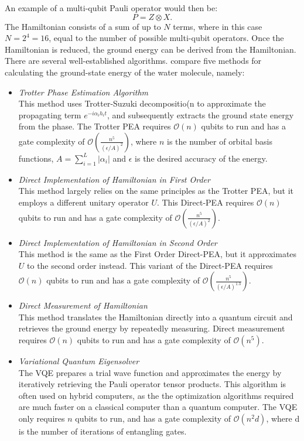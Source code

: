 \documentclass{article}
\begin{document}
An example of a multi-qubit Pauli operator would then be: $$ P = Z \otimes X.$$
The Hamiltonian consists of a sum of up to $N$ terms, where in this case $N = 2^4 = 16$, equal to the number of possible multi-qubit operators. Once the Hamiltonian is reduced, the ground energy can be derived from the Hamiltonian. There are several well-established algorithms. \textcite{bian} compare five methods for calculating the ground-state energy of the water molecule, namely:

\begin{itemize}
  \item \emph{Trotter Phase Estimation Algorithm}
  \\ This method uses Trotter-Suzuki decompositio(n to approximate  the propagating term $ e^{-i \alpha_{i} h_{i} t}$, and subsequently extracts the ground state energy from the phase. The Trotter PEA requires $\mathcal{O}(n)$ qubits to run and has a gate complexity of $\mathcal{O}(\frac{n^{5}}{(\epsilon / A)^{2}})$, where $n$ is the number of orbital basis functions, $A=\sum_{i=1}^{L}\left|\alpha_{i}\right|$ and $\epsilon$ is the desired accuracy of the energy.
  \item \emph{Direct Implementation of Hamiltonian in First Order}
  \\This method largely relies on the same principles as the Trotter PEA, but it employs a different unitary operator $U$. This Direct-PEA requires $\mathcal{O}(n)$ qubits to run and has a gate complexity of $\mathcal{O}(\frac{n^{5}}{(\epsilon / A)^{2}}).$
  \item \emph{Direct Implementation of Hamiltonian in Second Order}
  \\This method is the same as the First Order Direct-PEA, but it approximates $U$ to the second order instead. This variant of the Direct-PEA requires $\mathcal{O}(n)$ qubits to run and has a gate complexity of $\mathcal{O}(\frac{n^{5}}{(\epsilon / A)^{1.3}}).$
  \item \emph{Direct Measurement of Hamiltonian}
  \\This method translates the Hamiltonian directly into a quantum circuit and retrieves the ground energy by repeatedly measuring. Direct measurement requires $\mathcal{O}(n)$ qubits to run and has a gate complexity of $\mathcal{O}(n^{5}).$
  \item \emph{Variational Quantum Eigensolver}
  \\The VQE prepares a trial wave function and approximates the energy by iteratively retrieving the Pauli operator tensor products. This algorithm is often used on hybrid computers, as the the optimization algorithms required are much faster on a classical computer than a quantum computer. The VQE only requires $n$ qubits to run, and has a gate complexity of $\mathcal{O}(n^{2} d)$, where d is the number of iterations of entangling gates.

\end{itemize}
\end{document}
